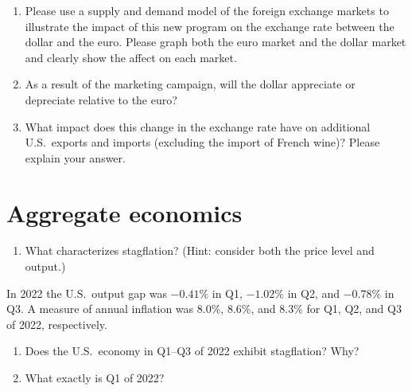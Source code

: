 \documentclass{assignment}
\begin{document}
\begin{enumerate}[resume]

\item Please use a supply and demand model of the foreign exchange markets to illustrate the impact of this new program on the exchange rate between the dollar and the euro. Please graph both the euro market and the dollar market and clearly show the affect on each market.

\vfill

\item As a result of the marketing campaign, will the dollar appreciate or depreciate relative to the euro?

\vspace{2.0\baselineskip}

\item What impact does this change in the exchange rate have on additional U.S.~exports and imports (excluding the import of French wine)? Please explain your answer.

\vspace{6.0\baselineskip}

\end{enumerate}

\clearpage

\section{Aggregate economics}

\begin{enumerate}

\item What characterizes stagflation? (Hint: consider both the price level and output.)

\vfill

\end{enumerate}

In 2022 the U.S.~output gap was $-0.41\%$ in Q1, $-1.02\%$ in Q2, and $-0.78\%$ in Q3. A measure of annual inflation was $8.0\%$, $8.6\%$, and $8.3\%$ for Q1, Q2, and Q3 of 2022, respectively.

\begin{enumerate}[resume]

\item Does the U.S.~economy in Q1--Q3 of 2022 exhibit stagflation? Why?

\vfill

\item What exactly is Q1 of 2022?

\vfill

\end{enumerate}
\end{document}
